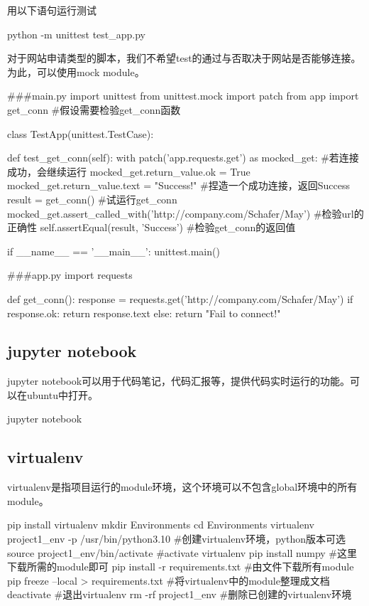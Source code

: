 用以下语句运行测试
\begin{codeblock}[language=bash, caption={run unittest}]
  python -m unittest test_app.py
\end{codeblock}

对于网站申请类型的脚本，我们不希望test的通过与否取决于网站是否能够连接。
为此，可以使用mock module。
\begin{codeblock}[language=python, caption={mock module}]
  #\#\#main.py
  import unittest
  from unittest.mock import patch
  from app import get_conn #假设需要检验get\_conn函数
  
  class TestApp(unittest.TestCase):
  
  def test_get_conn(self):
  with patch('app.requests.get') as mocked_get: #若连接成功，会继续运行
  mocked_get.return_value.ok = True
  mocked_get.return_value.text = "Success!" #捏造一个成功连接，返回Success
  result = get_conn() #试运行get\_conn
  mocked_get.assert_called_with('http://company.com/Schafer/May') 
  #检验url的正确性
  self.assertEqual(result, 'Success') #检验get\_conn的返回值
  
  if __name__ == '__main__':
  unittest.main()
  
  #\#\#app.py
  import requests
  
  def get_conn():
  response = requests.get('http://company.com/Schafer/May')
  if response.ok:
  return response.text
  else:
  return "Fail to connect!"
\end{codeblock}

\subsection{jupyter notebook}
jupyter notebook可以用于代码笔记，代码汇报等，提供代码实时运行的功能。可以在ubuntu中打开。
\begin{codeblock}[language=bash, caption={run jupyter notebok}]
  jupyter notebook
\end{codeblock}

\subsection{virtualenv}
virtualenv是指项目运行的module环境，这个环境可以不包含global环境中的所有module。
\begin{codeblock}[language=bash, caption={setup virtualenv}]
  pip install virtualenv 
  mkdir Environments
  cd Environments
  virtualenv project1_env -p /usr/bin/python3.10 #创建virtualenv环境，python版本可选
  source project1_env/bin/activate #activate virtualenv
  pip install numpy #这里下载所需的module即可
  pip install -r requirements.txt #由文件下载所有module 
  pip freeze --local > requirements.txt #将virtualenv中的module整理成文档
  deactivate #退出virtualenv
  rm -rf project1_env #删除已创建的virtualenv环境
\end{codeblock}

